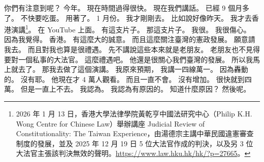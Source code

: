 \hypertarget{w01:cue:1338}{}你們有注意到呢？
\hypertarget{w01:cue:1339}{}今年。
\hypertarget{w01:cue:1340}{}現在時間過得很快。
\hypertarget{w01:cue:1341}{}現在我們講話。
\hypertarget{w01:cue:1342}{}已經 9 個月多了。
\hypertarget{w01:cue:1343}{}不快要吃蛋。
\hypertarget{w01:cue:1344}{}用著了。
\hypertarget{w01:cue:1345}{}1 月份。
\hypertarget{w01:cue:1346}{}我才剛剛去。
\hypertarget{w01:cue:1347}{}比如說好像昨天。
\hypertarget{w01:cue:1348}{}我才去香港演講\footnote{2026 年 1 月 13 日，香港大學法律學院黃乾亨中國法研究中心（Philip K.H. Wong Centre for Chinese Law）舉辦講座 Judicial Review of Constitutionality: The Taiwan Experience，由湯德宗主講中華民國違憲審查制度的發展，並及 2025 年 12 月 19 日 5 位大法官作成的判決，以及另 3 位大法官主張該判決無效的聲明。\url{https://www.law.hku.hk/hk/?p=27665}。}。
\hypertarget{w01:cue:1349}{}在 YouTube 上面。
\hypertarget{w01:cue:1350}{}有這支片子。
\hypertarget{w01:cue:1351}{}那這支片子。
\hypertarget{w01:cue:1352}{}我很。
\hypertarget{w01:cue:1353}{}我很傷心。
\hypertarget{w01:cue:1354}{}因為我覺得。
\hypertarget{w01:cue:1355}{}香港。
\hypertarget{w01:cue:1356}{}有這麼大的誠意。
\hypertarget{w01:cue:1357}{}而且這麼關注臺灣的憲政發展。
\hypertarget{w01:cue:1358}{}願意請我去。
\hypertarget{w01:cue:1359}{}而且對我也算是很禮遇。
\hypertarget{w01:cue:1360}{}先不講說這些本來就是老朋友。
\hypertarget{w01:cue:1361}{}老朋友也不見得要對一個私事的大法官。
\hypertarget{w01:cue:1362}{}這麼禮遇吧。
\hypertarget{w01:cue:1363}{}他還是很關心我們臺灣的發展。
\hypertarget{w01:cue:1364}{}所以我馬上就去了。
\hypertarget{w01:cue:1365}{}那我去做了這個演講。
\hypertarget{w01:cue:1366}{}我原來預期，
\hypertarget{w01:cue:1367}{}我講一四線萬一。
\hypertarget{w01:cue:1368}{}因為轟動的。
\hypertarget{w01:cue:1369}{}沒有耶。
\hypertarget{w01:cue:1370}{}他現在才 4 萬人觀看。
\hypertarget{w01:cue:1371}{}而且一直不會。
\hypertarget{w01:cue:1372}{}沒有增加。
\hypertarget{w01:cue:1373}{}很快就到四萬。
\hypertarget{w01:cue:1374}{}但是一直上不去。
\hypertarget{w01:cue:1375}{}我認為。
\hypertarget{w01:cue:1376}{}我認為有原因的。
\hypertarget{w01:cue:1377}{}知道什麼原因？
\hypertarget{w01:cue:1378}{}然後呢。

